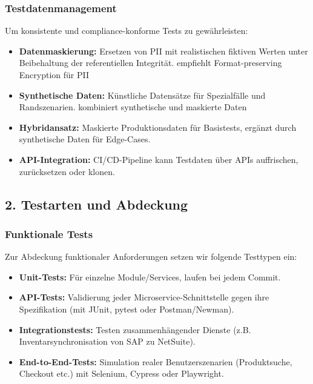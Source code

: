 \subsubsection{Testdatenmanagement}
Um konsistente und compliance-konforme Tests zu gewährleisten:
\begin{itemize}
    \item \textbf{Datenmaskierung:} Ersetzen von PII mit realistischen fiktiven Werten unter
    Beibehaltung der referentiellen Integrität.\citet{tricentis2024} empfiehlt Format-preserving
    Encryption für PII
    \item \textbf{Synthetische Daten:} Künstliche Datensätze für Spezialfälle und Randszenarien.
    \citet{browserstack2025} kombiniert synthetische und maskierte Daten
    \item \textbf{Hybridansatz:} Maskierte Produktionsdaten für Basistests, ergänzt durch
    synthetische Daten für Edge-Cases.
    \item \textbf{API-Integration:} CI/CD-Pipeline kann Testdaten über APIs auffrischen,
    zurücksetzen oder klonen.
\end{itemize}

\subsection{2. Testarten und Abdeckung}

\subsubsection{Funktionale Tests}

Zur Abdeckung funktionaler Anforderungen setzen wir folgende Testtypen ein:
\begin{itemize}
    \item \textbf{Unit-Tests:} Für einzelne Module/Services, laufen bei jedem Commit.
    \item \textbf{API-Tests:} Validierung jeder Microservice-Schnittstelle gegen ihre Spezifikation
    (mit JUnit, pytest oder Postman/Newman).
    \item \textbf{Integrationstests:} Testen zusammenhängender Dienste (z.B. Inventarsynchronisation
    von SAP zu NetSuite).
    \item \textbf{End-to-End-Tests:} Simulation realer Benutzerszenarien (Produktsuche, Checkout etc.)
    mit Selenium, Cypress oder Playwright.
\end{itemize}

